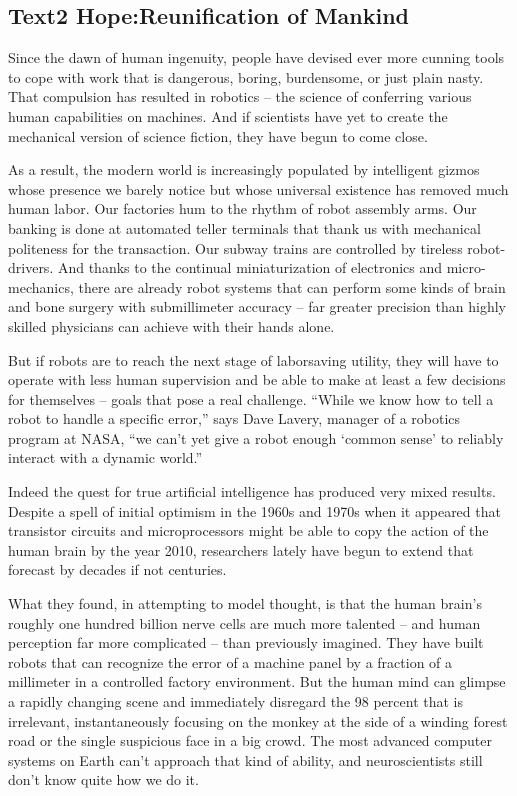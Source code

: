 \subsection{Text2 Hope:Reunification of Mankind}
Since the dawn of human ingenuity, people have devised ever more cunning tools to cope with work that is dangerous, boring, burdensome, or just plain nasty. That compulsion has resulted in robotics -- the science of conferring various human capabilities on machines. And if scientists have yet to create the mechanical version of science fiction, they have begun to come close.

As a result, the modern world is increasingly populated by intelligent gizmos whose presence we barely notice but whose universal existence has removed much human labor. Our factories hum to the rhythm of robot assembly arms. Our banking is done at automated teller terminals that thank us with mechanical politeness for the transaction. Our subway trains are controlled by tireless robot-drivers. And thanks to the continual miniaturization of electronics and micro-mechanics, there are already robot systems that can perform some kinds of brain and bone surgery with submillimeter accuracy -- far greater precision than highly skilled physicians can achieve with their hands alone.

But if robots are to reach the next stage of laborsaving utility, they will have to operate with less human supervision and be able to make at least a few decisions for themselves -- goals that pose a real challenge. “While we know how to tell a robot to handle a specific error,” says Dave Lavery, manager of a robotics program at NASA, “we can’t yet give a robot enough ‘common sense’ to reliably interact with a dynamic world.”

Indeed the quest for true artificial intelligence has produced very mixed results. Despite a spell of initial optimism in the 1960s and 1970s when it appeared that transistor circuits and microprocessors might be able to copy the action of the human brain by the year 2010, researchers lately have begun to extend that forecast by decades if not centuries.

What they found, in attempting to model thought, is that the human brain’s roughly one hundred billion nerve cells are much more talented -- and human perception far more complicated -- than previously imagined. They have built robots that can recognize the error of a machine panel by a fraction of a millimeter in a controlled factory environment. But the human mind can glimpse a rapidly changing scene and immediately disregard the 98 percent that is irrelevant, instantaneously focusing on the monkey at the side of a winding forest road or the single suspicious face in a big crowd. The most advanced computer systems on Earth can’t approach that kind of ability, and neuroscientists still don’t know quite how we do it.

